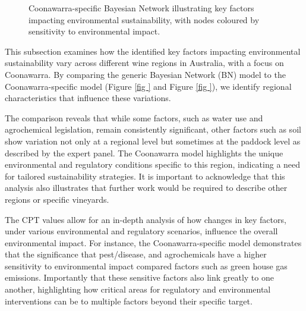 \begin{figure}[h!]
    \centering
    \caption{Coonawarra-specific Bayesian Network illustrating key factors impacting environmental sustainability, with nodes coloured by sensitivity to environmental impact.}
    \label{fig:coonawarra_bn}
  \end{figure}


  This subsection examines how the identified key factors impacting environmental sustainability vary across different wine regions in Australia, with a focus on Coonawarra. By comparing the generic Bayesian Network (BN) model to the Coonawarra-specific model (Figure \ref{fig
  } and Figure \ref{fig
  }), we identify regional characteristics that influence these variations.
  
The comparison reveals that while some factors, such as water use and agrochemical legislation, remain consistently significant, other factors such as soil show variation not only at a regional level but sometimes at the paddock level as described by the expert panel. The Coonawarra model highlights the unique environmental and regulatory conditions specific to this region, indicating a need for tailored sustainability strategies. It is important to acknowledge that this analysis also illustrates that further work would be required to describe other regions or specific vineyards. 

The CPT values allow for an in-depth analysis of how changes in key factors, under various environmental and regulatory scenarios, influence the overall environmental impact. For instance, the Coonawarra-specific model demonstrates that the significance that pest/disease, and agrochemicals have a higher sensitivity to environmental impact compared factors such as green house gas emissions. Importantly that these sensitive factors also link greatly to one another, highlighting how critical areas for regulatory and environmental interventions can be to multiple factors beyond their specific target.
  
